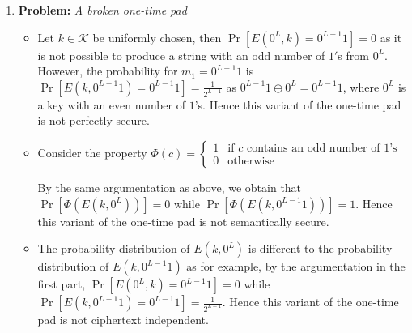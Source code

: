 \documentclass[11pt]{article}
\begin{document}
\begin{enumerate}
		\item
		\textbf{Problem:}\textit{ A broken one-time pad}
		
	   	\begin{itemize}
			\item Let $k \in \mathcal{K}$ be uniformly chosen, then $\Pr[E(0^L,k) = 0^{L-1}1] = 0$ as it is not possible to produce a string with an odd number of $1'$s from $0^L$. However, the probability for $m_1 = 0^{L-1}1$ is $\Pr[E(k,0^{L-1}1) = 0^{L-1}1] = \frac{1}{2^{L-1}}$ as $0^{L-1}1 \oplus 0^{L} = 0^{L-1}1$, where $0^L$ is a key with an even number of $1$'s. Hence this variant of the one-time pad is not perfectly secure.
			\item Consider the property $\Phi(c) = \begin{cases} 1 & \text{if $c$ contains an odd number of $1$'s}\\ 0 & \text{otherwise}\end{cases}$
			
			By the same argumentation as above, we obtain that $\Pr[\Phi(E(k,0^L))] = 0$ while $\Pr[\Phi(E(k,0^{L-1}1))] = 1$. Hence this variant of the one-time pad is not semantically secure.
			\item The probability distribution of $E(k,0^L)$ is different to the probability distribution of $E(k,0^{L-1}1)$ as for example, by the argumentation in the first part, $\Pr[E(0^L,k) = 0^{L-1}1] = 0$ while $\Pr[E(k,0^{L-1}1) = 0^{L-1}1] = \frac{1}{2^{L-1}}$. Hence this variant of the one-time pad is not ciphertext independent.
		\end{itemize}
	\end{enumerate}
	
\end{document}
